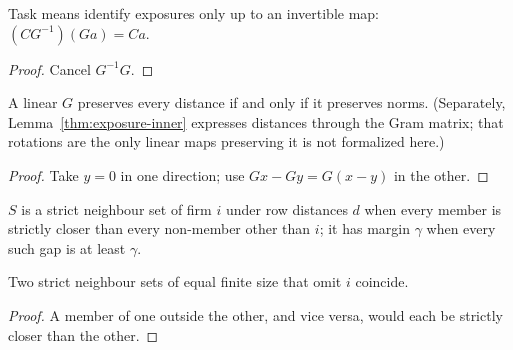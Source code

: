 \begin{theorem}\label{thm:geometry-equivalence}
  \leanok
  Task means identify exposures only up to an invertible map:
  $(CG^{-1})(Ga)=Ca$.
\end{theorem}
\begin{proof}\leanok
  Cancel $G^{-1}G$.
\end{proof}

\begin{theorem}\label{thm:geometry-distances}
  \leanok
  A linear $G$ preserves every distance if and only if it preserves norms.
  (Separately, Lemma~\ref{thm:exposure-inner} expresses distances through the
  Gram matrix; that rotations are the only linear maps preserving it is not
  formalized here.)
\end{theorem}
\begin{proof}\leanok
  Take $y=0$ in one direction; use $Gx-Gy=G(x-y)$ in the other.
\end{proof}

\begin{definition}\label{def:neighbours}
  \leanok
  $S$ is a strict neighbour set of firm $i$ under row distances $d$ when every
  member is strictly closer than every non-member other than $i$; it has
  margin $\gamma$ when every such gap is at least $\gamma$.
\end{definition}

\begin{lemma}\label{thm:neighbours-unique}
  \leanok
  Two strict neighbour sets of equal finite size that omit $i$ coincide.
\end{lemma}
\begin{proof}\leanok
  A member of one outside the other, and vice versa, would each be strictly
  closer than the other.
\end{proof}

